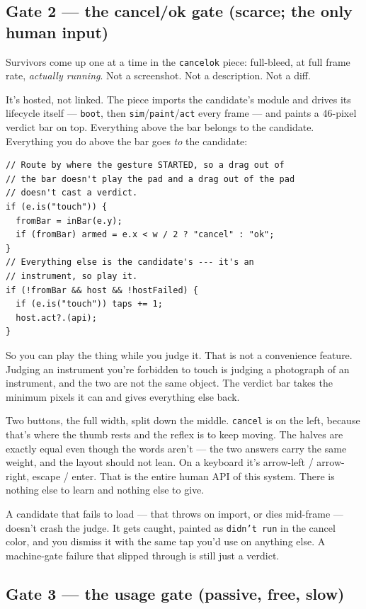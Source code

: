 \documentclass[10pt,letterpaper,twocolumn]{article}
\begin{document}
\subsection{Gate 2 --- the cancel/ok gate (scarce; the only human input)}

Survivors come up one at a time in the \texttt{cancelok} piece: full-bleed, at full frame rate, \emph{actually running}. Not a screenshot. Not a description. Not a diff.

It's hosted, not linked. The piece imports the candidate's module and drives its lifecycle itself --- \texttt{boot}, then \texttt{sim}/\texttt{paint}/\texttt{act} every frame --- and paints a 46-pixel verdict bar on top. Everything above the bar belongs to the candidate. Everything you do above the bar goes \emph{to} the candidate:

\begin{lstlisting}
// Route by where the gesture STARTED, so a drag out of
// the bar doesn't play the pad and a drag out of the pad
// doesn't cast a verdict.
if (e.is("touch")) {
  fromBar = inBar(e.y);
  if (fromBar) armed = e.x < w / 2 ? "cancel" : "ok";
}
// Everything else is the candidate's --- it's an
// instrument, so play it.
if (!fromBar && host && !hostFailed) {
  if (e.is("touch")) taps += 1;
  host.act?.(api);
}
\end{lstlisting}

So you can play the thing while you judge it. That is not a convenience feature. Judging an instrument you're forbidden to touch is judging a photograph of an instrument, and the two are not the same object. The verdict bar takes the minimum pixels it can and gives everything else back.

Two buttons, the full width, split down the middle. \texttt{cancel} is on the left, because that's where the thumb rests and the reflex is to keep moving. The halves are exactly equal even though the words aren't --- the two answers carry the same weight, and the layout should not lean. On a keyboard it's arrow-left / arrow-right, escape / enter. That is the entire human API of this system. There is nothing else to learn and nothing else to give.

A candidate that fails to load --- that throws on import, or dies mid-frame --- doesn't crash the judge. It gets caught, painted as \texttt{didn't run} in the cancel color, and you dismiss it with the same tap you'd use on anything else. A machine-gate failure that slipped through is still just a verdict.

\subsection{Gate 3 --- the usage gate (passive, free, slow)}
\end{document}
